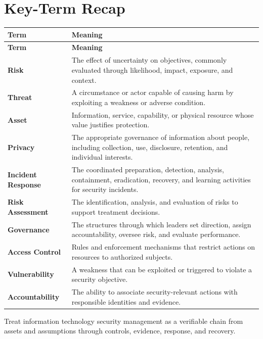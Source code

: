 \documentclass[11pt]{article}
\begin{document}
\section*{Key-Term Recap}
\begin{longtable}{>{\RaggedRight\arraybackslash}p{}>{\RaggedRight\arraybackslash}p{}}
\toprule\rowcolor{Navy}\color{white}\textbf{Term} & \color{white}\textbf{Meaning}\\\midrule
\endfirsthead
\toprule\rowcolor{Navy}\color{white}\textbf{Term} & \color{white}\textbf{Meaning}\\\midrule
\endhead
\textbf{Risk} & The effect of uncertainty on objectives, commonly evaluated through likelihood, impact, exposure, and context. \\\midrule
\textbf{Threat} & A circumstance or actor capable of causing harm by exploiting a weakness or adverse condition. \\\midrule
\textbf{Asset} & Information, service, capability, or physical resource whose value justifies protection. \\\midrule
\textbf{Privacy} & The appropriate governance of information about people, including collection, use, disclosure, retention, and individual interests. \\\midrule
\textbf{Incident Response} & The coordinated preparation, detection, analysis, containment, eradication, recovery, and learning activities for security incidents. \\\midrule
\textbf{Risk Assessment} & The identification, analysis, and evaluation of risks to support treatment decisions. \\\midrule
\textbf{Governance} & The structures through which leaders set direction, assign accountability, oversee risk, and evaluate performance. \\\midrule
\textbf{Access Control} & Rules and enforcement mechanisms that restrict actions on resources to authorized subjects. \\\midrule
\textbf{Vulnerability} & A weakness that can be exploited or triggered to violate a security objective. \\\midrule
\textbf{Accountability} & The ability to associate security-relevant actions with responsible identities and evidence. \\\midrule
\bottomrule
\end{longtable}
\begin{takeawaybox}
Treat information technology security management as a verifiable chain from assets and assumptions through controls, evidence, response, and recovery.
\end{takeawaybox}
\end{document}
